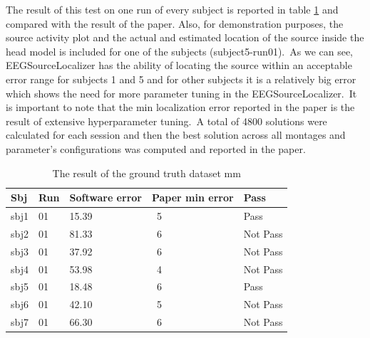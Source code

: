 \documentclass[12pt, titlepage]{article}
\renewcommand{\progname}{EEGSourceLocalizer}
\begin{document}
 The result of this test on one run of every subject is reported in table \ref{GTresult} and compared with the result of the paper. Also, for demonstration purposes, the source activity plot and the actual and estimated location of the source inside the head model is included for one of the subjects (subject5-run01).\ As we can see, \progname{} has the ability of locating the source within an acceptable error range for subjects 1 and 5 and for other subjects it is a relatively big error which shows the need for more parameter tuning in the \progname{}.\ It is important to note that the min localization error reported in the paper is the result of extensive hyperparameter tuning.\ A total of 4800 solutions were calculated for each session and then the best solution across all montages and parameter’s configurations was computed and reported in the paper. \\
 
 \begin{table}
 \caption{The result of the ground truth dataset  mm}
 \centering
    \begin{tabular}{| l | l | l | l | l |}
    \hline
    Sbj & Run & Software error & Paper min error  & Pass\\ \hline
    sbj1 & 01 &15.39 & ~5 &  Pass\\ \hline
    sbj2 & 01 & 81.33 & ~6 & Not Pass\\ \hline
    sbj3 & 01 & 37.92 & ~6 & Not Pass\\ \hline
    sbj4 & 01 & 53.98 & ~4 & Not Pass\\ \hline
    sbj5 & 01 &18.48& ~6 & Pass\\ \hline
    sbj6 & 01 & 42.10 & ~5 & Not Pass\\ \hline    
    sbj7 & 01 & 66.30 & ~6 & Not Pass\\ \hline
    \end{tabular}
\label{GTresult}
\end{table}
\end{document}

